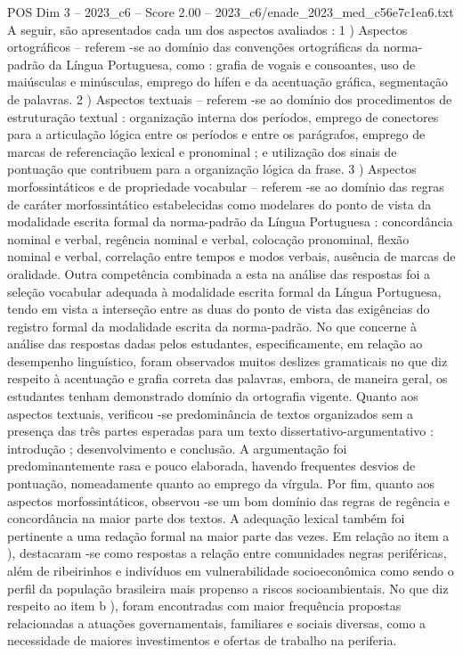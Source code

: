 \begin{textsample}{POS Dim 3 – 2023\_c6 – Score 2.00 – 2023\_c6/enade\_2023\_med\_c56e7c1ea6.txt}
A seguir, são apresentados cada um dos aspectos avaliados : 1 ) Aspectos ortográficos – referem -se ao domínio das convenções ortográficas da norma-padrão da Língua Portuguesa, como : grafia de vogais e consoantes, uso de maiúsculas e minúsculas, emprego do hífen e da acentuação gráfica, segmentação de palavras. 2 ) Aspectos textuais – referem -se ao domínio dos procedimentos de estruturação textual : organização interna dos períodos, emprego de conectores para a articulação lógica entre os períodos e entre os parágrafos, emprego de marcas de referenciação lexical e pronominal ; e utilização dos sinais de pontuação que contribuem para a organização lógica da frase. 3 ) Aspectos morfossintáticos e de propriedade vocabular – referem -se ao domínio das regras de caráter morfossintático estabelecidas como modelares do ponto de vista da modalidade escrita formal da norma-padrão da Língua Portuguesa : concordância nominal e verbal, regência nominal e verbal, colocação pronominal, flexão nominal e verbal, correlação entre tempos e modos verbais, ausência de marcas de oralidade.
Outra competência combinada a esta na análise das respostas foi a seleção vocabular adequada à modalidade escrita formal da Língua Portuguesa, tendo em vista a interseção entre as duas do ponto de vista das exigências do registro formal da modalidade escrita da norma-padrão.
No que concerne à análise das respostas dadas pelos estudantes, especificamente, em relação ao desempenho linguístico, foram observados muitos deslizes gramaticais no que diz respeito à acentuação e grafia correta das palavras, embora, de maneira geral, os estudantes tenham demonstrado domínio da ortografia vigente.
Quanto aos aspectos textuais, verificou -se predominância de textos organizados sem a presença das três partes esperadas para um texto dissertativo-argumentativo : introdução ; desenvolvimento e conclusão.
A argumentação foi predominantemente rasa e pouco elaborada, havendo frequentes desvios de pontuação, nomeadamente quanto ao emprego da vírgula.
Por fim, quanto aos aspectos morfossintáticos, observou -se um bom domínio das regras de regência e concordância na maior parte dos textos.
A adequação lexical também foi pertinente a uma redação formal na maior parte das vezes.
Em relação ao item a ), destacaram -se como respostas a relação entre comunidades negras periféricas, além de ribeirinhos e indivíduos em vulnerabilidade socioeconômica como sendo o perfil da população brasileira mais propenso a riscos socioambientais.
No que diz respeito ao item b ), foram encontradas com maior frequência propostas relacionadas a atuações governamentais, familiares e sociais diversas, como a necessidade de maiores investimentos e ofertas de trabalho na periferia.

\end{textsample}
